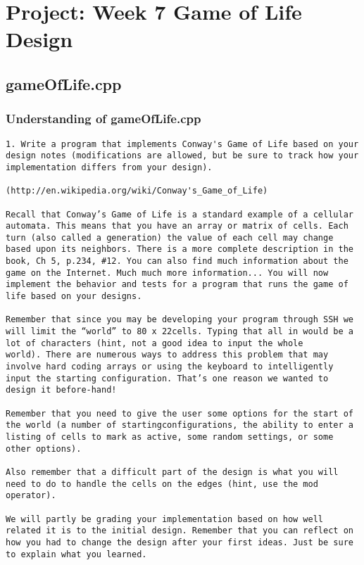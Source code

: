 \documentclass[11pt, oneside]{memoir}
\begin{document}
\chapter{Project: Week 7 Game of Life Design}
\section{gameOfLife.cpp}

\subsection{Understanding of gameOfLife.cpp}

\begin{verbatim}
1. Write a program that implements Conway's Game of Life based on your
design notes (modifications are allowed, but be sure to track how your
implementation differs from your design). 

(http://en.wikipedia.org/wiki/Conway's_Game_of_Life)

Recall that Conway’s Game of Life is a standard example of a cellular
automata. This means that you have an array or matrix of cells. Each
turn (also called a generation) the value of each cell may change
based upon its neighbors. There is a more complete description in the
book, Ch 5, p.234, #12. You can also find much information about the
game on the Internet. Much much more information... You will now
implement the behavior and tests for a program that runs the game of
life based on your designs. 

Remember that since you may be developing your program through SSH we
will limit the “world” to 80 x 22cells. Typing that all in would be a
lot of characters (hint, not a good idea to input the whole
world). There are numerous ways to address this problem that may
involve hard coding arrays or using the keyboard to intelligently
input the starting configuration. That’s one reason we wanted to
design it before-hand! 

Remember that you need to give the user some options for the start of
the world (a number of startingconfigurations, the ability to enter a
listing of cells to mark as active, some random settings, or some
other options).

Also remember that a difficult part of the design is what you will
need to do to handle the cells on the edges (hint, use the mod
operator).

We will partly be grading your implementation based on how well
related it is to the initial design. Remember that you can reflect on
how you had to change the design after your first ideas. Just be sure
to explain what you learned.


\end{verbatim}
\end{document}
